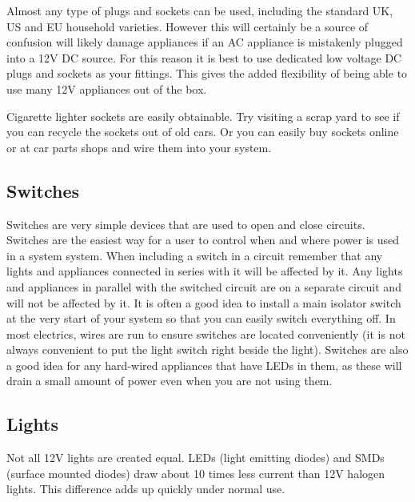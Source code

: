 \documentclass{article}
\theoremstyle{definition}
\theoremstyle{definition}
\theoremstyle{remark}
\begin{document}
    Almost any type of plugs and sockets can be used, including the standard UK, US and EU household varieties. However this will certainly be a source of confusion will likely damage appliances if an AC appliance is mistakenly plugged into a 12V DC source. For this reason it is best to use dedicated low voltage DC plugs and sockets as your fittings. This gives the added flexibility of being able to use many 12V appliances out of the box.

    Cigarette lighter sockets are easily obtainable. Try visiting a scrap yard to see if you can recycle the sockets out of old cars. Or you can easily buy sockets online or at car parts shops and wire them into your system.
  

  {\color{blue}\subsection{Switches}} %
  \label{sub:switches}

    Switches are very simple devices that are used to open and close circuits. Switches are the easiest way for a user to control when and where power is used in a system system. When including a switch in a circuit remember that any lights and appliances connected in series with it will be affected by it. Any lights and appliances in parallel with the switched circuit are on a separate circuit and will not be affected by it. It is often a good idea to install a main isolator switch at the very start of your system so that you can easily switch everything off. In most electrics, wires are run to ensure switches are located conveniently (it is not always convenient to put the light switch right beside the light). Switches are also a good idea for any hard-wired appliances that have LEDs in them, as these will drain a small amount of power even when you are not using them.
  

  {\color{blue}\subsection{Lights}} %
  \label{sub:lights}

    Not all 12V lights are created equal. LEDs (light emitting diodes) and SMDs (surface mounted diodes) draw about 10 times less current than 12V halogen lights. This difference adds up quickly under normal use. 
  
\end{document}

